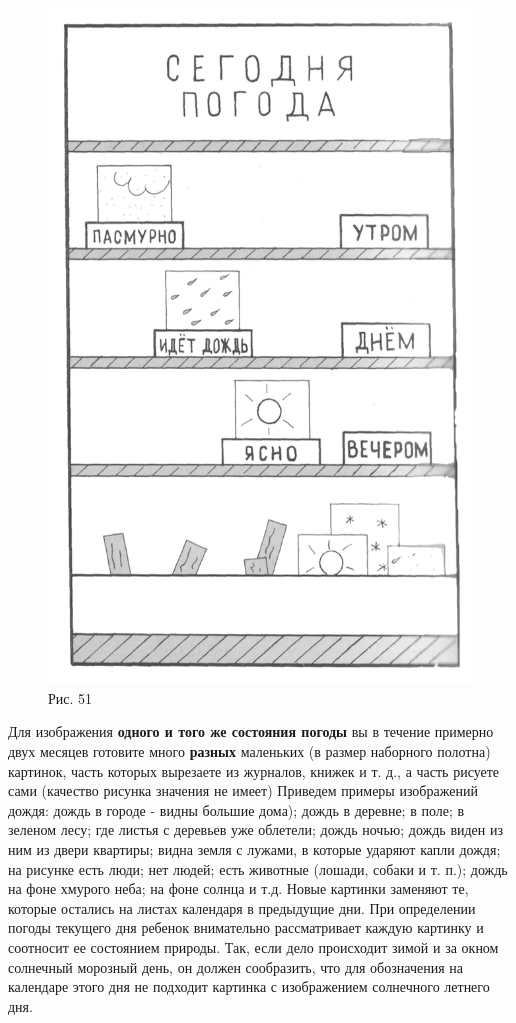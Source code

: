 \documentclass{book}
\begin{document}
\begin{figure}
\centering
\includegraphics[width=0.8\linewidth]{media/media/image47.png}
\caption*{Рис. 51}
\end{figure}


Для изображения \textbf{одного и того же состояния погоды} вы в течение
примерно двух месяцев готовите много \textbf{разных} маленьких (в размер
наборного полотна) картинок, часть которых вырезаете из журналов, книжек
и т. д., а часть рисуете сами (качество рисунка значения не имеет)
Приведем примеры изображений дождя: дождь в городе - видны большие
дома); дождь в деревне; в поле; в зеленом лесу; где листья с деревьев
уже облетели; дождь ночью; дождь виден из ним из двери квартиры; видна
земля с лужами, в которые ударяют капли дождя; на рисунке есть люди; нет
людей; есть животные (лошади, собаки и т. п.); дождь на фоне хмурого
неба; на фоне солнца и т.д. Новые картинки заменяют те, которые остались
на листах календаря в предыдущие дни. При определении погоды текущего
дня ребенок внимательно рассматривает каждую картинку и соотносит ее
состоянием природы. Так, если дело происходит зимой и за окном солнечный
морозный день, он должен сообразить, что для обозначения на календаре
этого дня не подходит картинка с изображением солнечного летнего дня.
\end{document}
